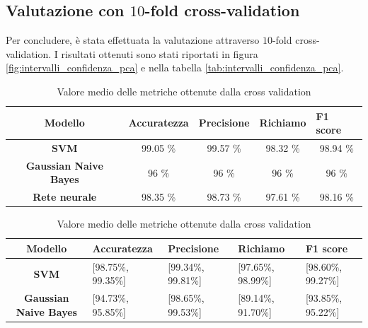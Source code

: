 \subsection*{Valutazione con $10$-fold cross-validation}
Per concludere, è stata effettuata la valutazione attraverso $10$-fold
cross-validation. I risultati ottenuti sono stati riportati in figura
\ref{fig:intervalli_confidenza_pca} e nella tabella \ref{tab:intervalli_confidenza_pca}.
\begin{table}[!ht]
    \begin{subtable}[h]{1\textwidth}
        \centering
        \begin{tabular}{@{}cllll@{}}
            \toprule
            \rowcolor[HTML]{EFEFEF}
            \textbf{Modello}                                      & \textbf{Accuratezza}         & \textbf{Precisione}          & \textbf{Richiamo}            & \textbf{F1 score}            \\ \midrule
            \cellcolor[HTML]{EFEFEF}\textbf{SVM}                  & \multicolumn{1}{c}{99.05 \%} & \multicolumn{1}{c}{99.57 \%} & \multicolumn{1}{c}{98.32 \%} & \multicolumn{1}{c}{98.94 \%} \\
            \cellcolor[HTML]{EFEFEF}\textbf{Gaussian Naive Bayes} & \multicolumn{1}{c}{96 \%}    & \multicolumn{1}{c}{96 \%}    & \multicolumn{1}{c}{96 \%}    & \multicolumn{1}{c}{96 \%}    \\
            \cellcolor[HTML]{EFEFEF}\textbf{Rete neurale}         & \multicolumn{1}{c}{98.35 \%} & \multicolumn{1}{c}{98.73 \%} & \multicolumn{1}{c}{97.61 \%} & \multicolumn{1}{c}{98.16 \%} \\ \bottomrule
        \end{tabular}
        \caption{Valore medio delle metriche ottenute dalla cross validation}
        \label{tab:risultati_cross_val_pca}
    \end{subtable}
    \hfill
    \begin{subtable}[h]{1\textwidth}
        \centering
        \begin{tabular}{@{}cllll@{}}
            \toprule
            \rowcolor[HTML]{EFEFEF}
            \textbf{Modello}                                      & \textbf{Accuratezza} & \textbf{Precisione} & \textbf{Richiamo}  & \textbf{F1 score}  \\ \midrule
            \cellcolor[HTML]{EFEFEF}\textbf{SVM}                  & [98.75\%, 99.35\%]   & [99.34\%, 99.81\%]  & [97.65\%, 98.99\%] & [98.60\%, 99.27\%] \\
            \cellcolor[HTML]{EFEFEF}\textbf{Gaussian Naive Bayes} & [94.73\%, 95.85\%]   & [98.65\%, 99.53\%]  & [89.14\%, 91.70\%] & [93.85\%, 95.22\%] \\

\end{tabular}
\end{subtable}
\end{table}
